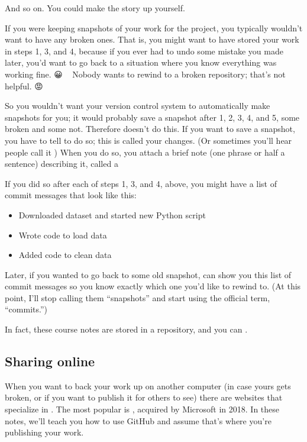 \documentclass[letterpaper,10pt,english]{sphinxmanual}
\begin{document}
And so on.  You could make the story up yourself.

If you were keeping snapshots of your work for the project, you typically wouldn’t want to have any broken ones.  That is, you might want to have stored your work in steps 1, 3, and 4, because if you ever had to undo some mistake you made later, you’d want to go back to a situation where you know everything was working fine. 😀    Nobody wants to rewind to a broken repository; that’s not helpful. 😡

So you wouldn’t want your version control system to automatically make snapshots for you; it would probably save a snapshot after 1, 2, 3, 4, and 5, some broken and some not.  Therefore  doesn’t do this.  If you want to save a snapshot, you have to tell  to do so; this is called  your changes.  (Or sometimes you’ll hear people call it )  When you do so, you attach a brief note (one phrase or half a sentence) describing it, called a 

If you did so after each of steps 1, 3, and 4, above, you might have a list of commit messages that look like this:
\begin{itemize}
\item {} 
Downloaded dataset and started new Python script

\item {} 
Wrote code to load data

\item {} 
Added code to clean data

\end{itemize}

Later, if you wanted to go back to some old snapshot,  can show you this list of commit messages so you know exactly which one you’d like to rewind to.  (At this point, I’ll stop calling them “snapshots” and start using the official term, “commits.”)

In fact, these course notes are stored in a  repository, and you can .


\subsection{Sharing online}
\label{\detokenize{chapter-8-version-control:sharing-online}}
When you want to back your work up on another computer (in case yours gets broken, or if you want to publish it for others to see) there are websites that specialize in .  The most popular is , acquired by Microsoft in 2018.  In these notes, we’ll teach you how to use GitHub and assume that’s where you’re publishing your work.
\end{document}
